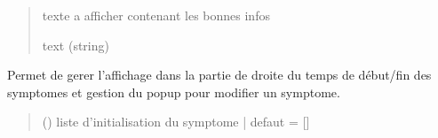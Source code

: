 \documentclass[letterpaper,10pt,english]{sphinxmanual}
\begin{document}
\begin{fulllineitems}
\begin{fulllineitems}
\begin{quote}
\begin{description}
\sphinxAtStartPar
texte a afficher contenant les bonnes infos

\sphinxAtStartPar
text (string)

\end{description}\end{quote}

\end{fulllineitems}


\begin{fulllineitems}
\label{\detokenize{general_interface:general_interface_V9.InterfaceGenerale.update_right_panel}}
\pysigstartsignatures
{}
\pysigstopsignatures
\sphinxAtStartPar
Permet de gerer l’affichage dans la partie de droite du temps de début/fin des symptomes et gestion du pop\sphinxhyphen{}up pour modifier un symptome.
\begin{quote}\begin{description}
\sphinxAtStartPar
{} () \textendash{} liste d’initialisation du symptome | defaut = {[}{]}

\end{description}\end{quote}

\end{fulllineitems}


\end{fulllineitems}

\end{document}
